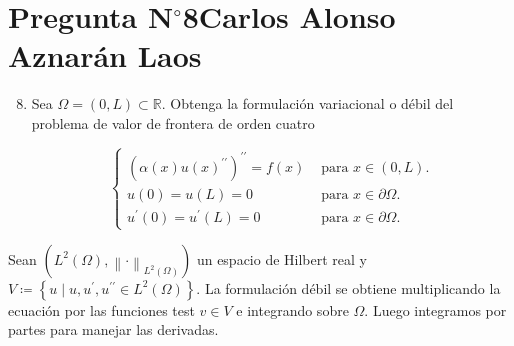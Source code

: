 \section{Pregunta N$^{\circ}$8\qquad Carlos Alonso Aznarán Laos}

\begin{frame}[fragile]
    \begin{enumerate}\setcounter{enumi}{7}
        \item


              Sea $\Omega=\left(0,L\right)\subset\mathbb{R}$. Obtenga
              la formulación variacional o débil del problema
              de valor de frontera de orden cuatro

              \begin{equation*}
                  \begin{cases}
                      {\left(
                          \alpha\left(x\right)
                              {u\left(x\right)}^{\prime\prime}
                      \right)}^{\prime\prime}=f\left(x\right) &
                      \text { para }
                      x\in\left(0,L\right).                                                       \\
                      u\left(0\right)=
                      u\left(L\right)=0
                                                              & \text { para }x\in\partial\Omega. \\
                      u^{\prime}\left(0\right)=
                      u^{\prime}\left(L\right)=
                      0                                       &
                      \text { para }x\in\partial\Omega.
                  \end{cases}
              \end{equation*}

    \end{enumerate}

    \begin{solution}

        Sean $\left(L^{2}(\Omega),\left\|\cdot\right\|_{L^{2}(\Omega)}\right)$ un espacio de Hilbert real y
        \begin{math}
            V\coloneqq
            \left\{
            u\mid
            u,
            u^{\prime},
            u^{\prime\prime}\in
            L^{2}(\Omega)
            \right\}
        \end{math}.
        La formulación débil se obtiene multiplicando la ecuación por
        las funciones test $v\in V$ e integrando sobre $\Omega$.
        Luego integramos por partes para manejar las derivadas.



\end{solution}
\end{frame}
